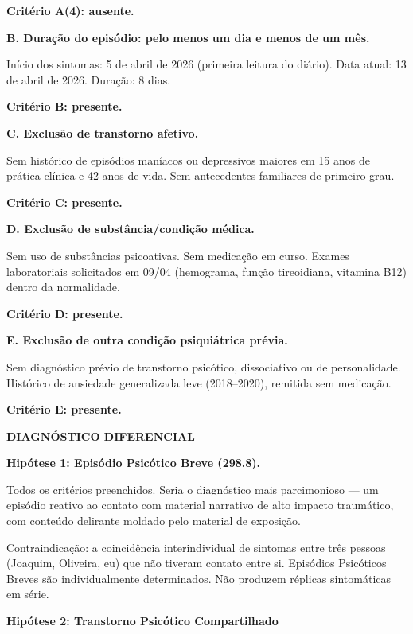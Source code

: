 \noindent \textbf{Critério A(4): ausente.}

\noindent \textbf{B. Duração do episódio: pelo menos um dia e menos de um mês.}

\noindent Início dos sintomas: 5 de abril de 2026 (primeira leitura
\noindent do diário). Data atual: 13 de abril de 2026. Duração: 8 dias.

\noindent \textbf{Critério B: presente.}

\noindent \textbf{C. Exclusão de transtorno afetivo.}

\noindent Sem histórico de episódios maníacos ou depressivos
\noindent maiores em 15 anos de prática clínica e 42 anos de vida. Sem
\noindent antecedentes familiares de primeiro grau.

\noindent \textbf{Critério C: presente.}

\noindent \textbf{D. Exclusão de substância/condição médica.}

\noindent Sem uso de substâncias psicoativas. Sem medicação em
\noindent curso. Exames laboratoriais solicitados em 09/04 (hemograma,
\noindent função tireoidiana, vitamina B12) dentro da normalidade.

\noindent \textbf{Critério D: presente.}

\noindent \textbf{E. Exclusão de outra condição psiquiátrica prévia.}

\noindent Sem diagnóstico prévio de transtorno psicótico,
\noindent dissociativo ou de personalidade. Histórico de ansiedade generalizada
\noindent leve (2018--2020), remitida sem medicação.

\noindent \textbf{Critério E: presente.}

\noindent \textbf{DIAGNÓSTICO DIFERENCIAL}

\noindent \textbf{Hipótese 1: Episódio Psicótico Breve (298.8).}

\noindent Todos os critérios preenchidos. Seria o diagnóstico
\noindent mais parcimonioso --- um episódio reativo ao contato com material
\noindent narrativo de alto impacto traumático, com conteúdo delirante
\noindent moldado pelo material de exposição.

\noindent Contraindicação: a coincidência interindividual de
\noindent sintomas entre três pessoas (Joaquim, Oliveira, eu) que não tiveram
\noindent contato entre si. Episódios Psicóticos Breves são individualmente
\noindent determinados. Não produzem réplicas sintomáticas em série.

\textbf{Hipótese 2: Transtorno Psicótico Compartilhado}

